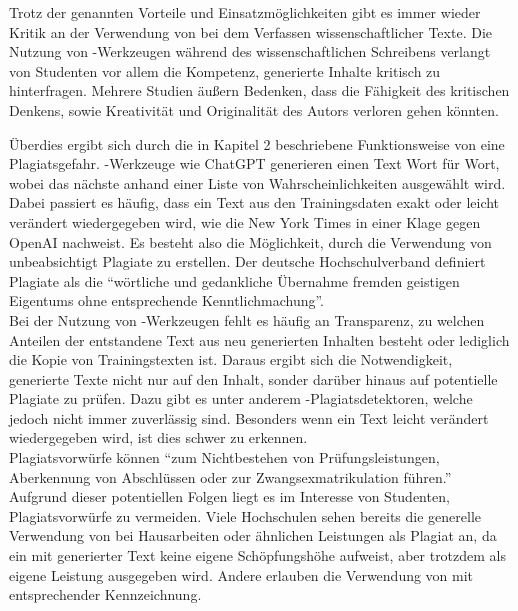 \documentclass[../main.tex]{subfiles}
\begin{document}
Trotz der genannten Vorteile und Einsatzmöglichkeiten gibt es immer wieder Kritik an der Verwendung von  bei dem Verfassen wissenschaftlicher Texte. 
Die Nutzung von -Werkzeugen während des wissenschaftlichen Schreibens verlangt von Studenten vor allem die Kompetenz, generierte Inhalte kritisch zu 
hinterfragen. Mehrere Studien äußern Bedenken, dass die Fähigkeit des kritischen Denkens, sowie Kreativität und Originalität des Autors verloren gehen könnten.\cite{ZukunftWissenschaftlichesPublizieren,teachers,BucherSchwarzerHolzwweißig}

Überdies ergibt sich durch die in Kapitel 2 beschriebene Funktionsweise von  eine Plagiatsgefahr. -Werkzeuge wie ChatGPT generieren einen Text Wort für Wort, wobei das nächste anhand 
einer Liste von Wahrscheinlichkeiten ausgewählt wird. Dabei passiert es häufig, dass ein Text aus den Trainingsdaten exakt oder leicht verändert wiedergegeben wird, wie die New York Times in 
einer Klage gegen OpenAI nachweist\cite{NYTimes}. Es besteht also die Möglichkeit, durch die Verwendung von  unbeabsichtigt Plagiate zu erstellen. Der deutsche Hochschulverband definiert Plagiate als 
die "`wörtliche und gedankliche Übernahme fremden geistigen Eigentums ohne entsprechende Kenntlichmachung"'.\cite{Hochschulverband} \\ Bei der Nutzung von -Werkzeugen fehlt es häufig an Transparenz, 
zu welchen Anteilen der entstandene Text aus neu generierten Inhalten besteht oder lediglich die Kopie von Trainingstexten ist. Daraus ergibt sich die Notwendigkeit,  generierte Texte nicht nur 
auf den Inhalt, sonder darüber hinaus auf potentielle Plagiate zu prüfen. Dazu gibt es unter anderem -Plagiatsdetektoren, welche jedoch nicht immer zuverlässig sind. Besonders wenn ein Text 
leicht verändert wiedergegeben wird, ist dies schwer zu erkennen.\\ Plagiatsvorwürfe können "`zum Nichtbestehen von Prüfungsleistungen, Aberkennung von Abschlüssen  oder  zur  Zwangsexmatrikulation  
führen."'\cite{Plagiate} Aufgrund dieser potentiellen Folgen liegt es im Interesse von Studenten, Plagiatsvorwürfe zu vermeiden. Viele Hochschulen sehen bereits die generelle Verwendung von  bei Hausarbeiten 
oder ähnlichen Leistungen als Plagiat an, da ein mit  generierter Text keine eigene Schöpfungshöhe aufweist, aber trotzdem als eigene Leistung ausgegeben wird. Andere erlauben die Verwendung von 
 mit entsprechender Kennzeichnung.\cite{Plagiate}
\end{document}
